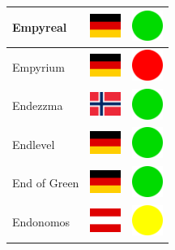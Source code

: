 \documentclass[12pt, a4paper, twoside]{report}
\begin{document}
\begin{center}
\begin{longtable}{|p{5cm}|p{2cm}|p{2cm}|}
 Empyreal                                                   & \includegraphics[width=1cm]{../img/flags/de} &   \includegraphics[width=1cm]{../likes/y} \\ \hline
 Empyrium                                                   & \includegraphics[width=1cm]{../img/flags/de} &   \includegraphics[width=1cm]{../likes/n} \\ \hline
 Endezzma                                                   & \includegraphics[width=1cm]{../img/flags/no} &   \includegraphics[width=1cm]{../likes/y} \\ \hline
 Endlevel                                                   & \includegraphics[width=1cm]{../img/flags/de} &   \includegraphics[width=1cm]{../likes/y} \\ \hline
 End of Green                                               & \includegraphics[width=1cm]{../img/flags/de} &   \includegraphics[width=1cm]{../likes/y} \\ \hline
 Endonomos                                                  & \includegraphics[width=1cm]{../img/flags/at} &   \includegraphics[width=1cm]{../likes/m} \\ \hline

\end{longtable}
\end{center}
\end{document}
